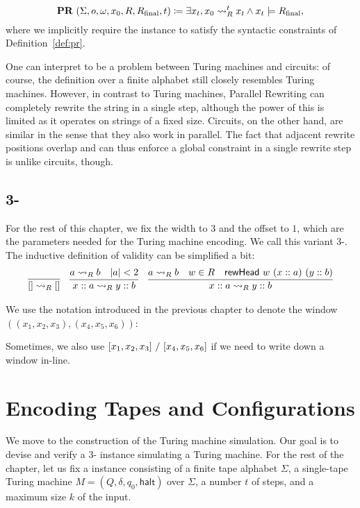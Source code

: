 \begin{definition}
  \[\textbf{PR}{}~(\Sigma, o, \omega, x_0, R, R_{\text{final}}, t) \coloneqq \exists x_t, x_0 \rightsquigarrow_{R}^t x_t \land x_t \models R_{\text{final}}, \]
  where we implicitly require the instance to satisfy the syntactic constraints of Definition~\ref{def:pr}. 
\end{definition}

One can interpret \PR{} to be a problem between Turing machines and circuits: of course, the definition over a finite alphabet still closely resembles Turing machines. However, in contrast to Turing machines, Parallel Rewriting can completely rewrite the string in a single step, although the power of this is limited as it operates on strings of a fixed size. 
Circuits, on the other hand, are similar in the sense that they also work in parallel. The fact that adjacent rewrite positions overlap and can thus enforce a global constraint in a single rewrite step is unlike circuits, though. 

\subsection{3-\PR{}}
For the rest of this chapter, we fix the width to $3$ and the offset to $1$, which are the parameters needed for the Turing machine encoding. We call this variant 3-\PR{}. 
The inductive definition of validity can be simplified a bit:
\begin{align*}
  \infer{\nil \strent{R} \nil}{} \quad
  \infer{x::a \strent{R} y ::b}{a \strent{R} b \quad \length{a} < 2} \quad
  \infer{x::a \strent{R} y :: b}{a \strent{R} b \quad w \in R \quad \rewHead{w}{x::a}{y::b}}
\end{align*}

We use the notation introduced in the previous chapter to denote the window $((x_1, x_2, x_3), (x_4, x_5, x_6))$: 
\begin{center}
\end{center}
Sometimes, we also use $[x_1, x_2, x_3]~/~[x_4, x_5, x_6]$ if we need to write down a window in-line.

\section{Encoding Tapes and Configurations}
We move to the construction of the Turing machine simulation. Our goal is to devise and verify a 3-\PR{} instance simulating a Turing machine. 
For the rest of the chapter, let us fix a \gennp{} instance consisting of a finite tape alphabet $\Sigma$, a single-tape Turing machine $M = (Q, \delta, q_0, \textsf{halt})$ over $\Sigma$, a number $t$ of steps, and a maximum size $k$ of the input. 

